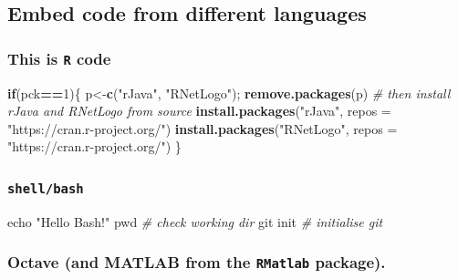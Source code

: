 \documentclass[10,portrait]{article}
\newenvironment{Shaded}{\begin{snugshade}}{\end{snugshade}}
\newcommand{\KeywordTok}[1]{\textcolor[rgb]{0.13,0.29,0.53}{\textbf{#1}}}
\newcommand{\DataTypeTok}[1]{\textcolor[rgb]{0.13,0.29,0.53}{#1}}
\newcommand{\DecValTok}[1]{\textcolor[rgb]{0.00,0.00,0.81}{#1}}
\newcommand{\StringTok}[1]{\textcolor[rgb]{0.31,0.60,0.02}{#1}}
\newcommand{\CommentTok}[1]{\textcolor[rgb]{0.56,0.35,0.01}{\textit{#1}}}
\newcommand{\FunctionTok}[1]{\textcolor[rgb]{0.00,0.00,0.00}{#1}}
\newcommand{\ControlFlowTok}[1]{\textcolor[rgb]{0.13,0.29,0.53}{\textbf{#1}}}
\newcommand{\OperatorTok}[1]{\textcolor[rgb]{0.81,0.36,0.00}{\textbf{#1}}}
\newcommand{\BuiltInTok}[1]{#1}
\newcommand{\NormalTok}[1]{#1}
\begin{document}
\newpage  

\subsection{Embed code from different
languages}\label{embed-code-from-different-languages}

\subsubsection{\texorpdfstring{This is \texttt{R}
code}{This is R code}}\label{this-is-r-code}

\begin{Shaded}
\begin{Highlighting}[]
\ControlFlowTok{if}\NormalTok{(pck}\OperatorTok{==}\DecValTok{1}\NormalTok{)\{}
\NormalTok{  p<-}\KeywordTok{c}\NormalTok{(}\StringTok{"rJava"}\NormalTok{, }\StringTok{"RNetLogo"}\NormalTok{); }\KeywordTok{remove.packages}\NormalTok{(p)}
  \CommentTok{# then install rJava and RNetLogo from source}
  \KeywordTok{install.packages}\NormalTok{(}\StringTok{"rJava"}\NormalTok{, }\DataTypeTok{repos =} \StringTok{"https://cran.r-project.org/"}\NormalTok{)}
  \KeywordTok{install.packages}\NormalTok{(}\StringTok{"RNetLogo"}\NormalTok{, }\DataTypeTok{repos =} \StringTok{"https://cran.r-project.org/"}\NormalTok{)}
\NormalTok{\}}
\end{Highlighting}
\end{Shaded}

\subsubsection{\texorpdfstring{\texttt{shell/bash}}{shell/bash}}\label{shellbash}

\begin{Shaded}
\begin{Highlighting}[]
\BuiltInTok{echo} \StringTok{"Hello Bash!"}  
\BuiltInTok{pwd} \CommentTok{# check working dir}
\FunctionTok{git}\NormalTok{ init }\CommentTok{# initialise git}
\end{Highlighting}
\end{Shaded}

\subsubsection{\texorpdfstring{Octave (and MATLAB from the
\texttt{RMatlab}
package).}{Octave (and MATLAB from the RMatlab package).}}\label{octave-and-matlab-from-the-rmatlab-package.}
\end{document}

